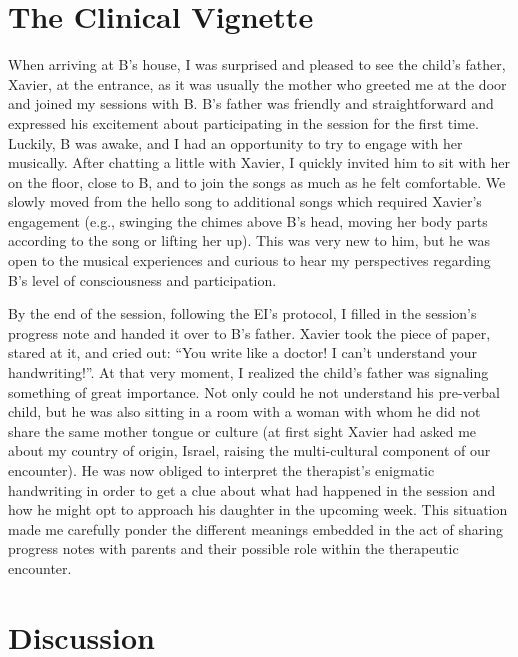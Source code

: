 \documentclass[authordate, empirical, issue]{jote-new-article}
\begin{document}
\section{The Clinical Vignette}



When arriving at B's house, I was surprised and pleased to see the child's father, Xavier, at the entrance, as it was usually the mother who greeted me at the door and joined my sessions with B. B's father was friendly and straightforward and expressed his excitement about participating in the session for the first time. Luckily, B was awake, and I had an opportunity to try to engage with her musically. After chatting a little with Xavier, I quickly invited him to sit with her on the floor, close to B, and to join the songs as much as he felt comfortable. We slowly moved from the hello song to additional songs which required Xavier's engagement (e.g., swinging the chimes above B's head, moving her body parts according to the song or lifting her up). This was very new to him, but he was open to the musical experiences and curious to hear my perspectives regarding B's level of consciousness and participation.



By the end of the session, following the EI's protocol, I filled in the session's progress note and handed it over to B's father. Xavier took the piece of paper, stared at it, and cried out: “You write like a doctor! I can't understand your handwriting!”. At that very moment, I realized the child's father was signaling something of great importance. Not only could he not understand his pre-verbal child, but he was also sitting in a room with a woman with whom he did not share the same mother tongue or culture (at first sight Xavier had asked me about my country of origin, Israel, raising the multi-cultural component of our encounter). He was now obliged to interpret the therapist's enigmatic handwriting in order to get a clue about what had happened in the session and how he might opt to approach his daughter in the upcoming week. This situation made me carefully ponder the different meanings embedded in the act of sharing progress notes with parents and their possible role within the therapeutic encounter.



\section{Discussion}
\end{document}
